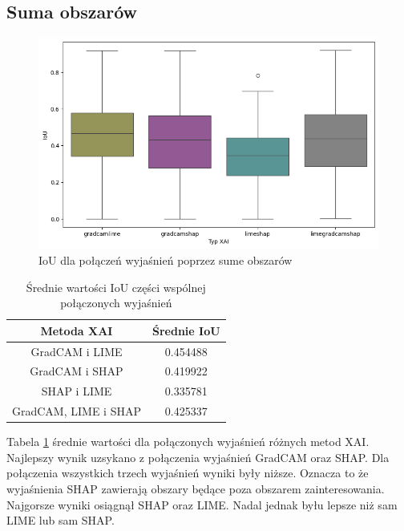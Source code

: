 \subsection*{Suma obszarów}
\begin{figure}
	\centering\includegraphics[width=.6\textwidth]{img/combine_iou_or}
	\caption{IoU dla połączeń wyjaśnień poprzez sume obszarów}  \label{rys:combine_iou_or}
\end{figure}
\begin{table}
	\centering
	\begin{tabular}{|c|c|}
		\hline
		\textbf{Metoda XAI}  & Średnie IoU \\
		\hline
		GradCAM i LIME       & 0.454488    \\
		\hline
		GradCAM i SHAP       & 0.419922    \\
		\hline
		SHAP i LIME          & 0.335781    \\
		\hline
		GradCAM, LIME i SHAP & 0.425337    \\
		\hline
	\end{tabular}
	\caption{Średnie wartości IoU części wspólnej połączonych wyjaśnień}
	\label{tab:combineandiou}
\end{table}
Tabela \ref{tab:combineandiou} średnie wartości dla połączonych wyjaśnień różnych metod XAI.
Najlepszy wynik uzsykano z połączenia wyjaśnień GradCAM oraz SHAP.
Dla połączenia wszystkich trzech wyjaśnień wyniki były niższe.
Oznacza to że wyjaśnienia SHAP zawierają obszary będące poza obszarem zainteresowania.
Najgorsze wyniki osiągnął SHAP oraz LIME.
Nadal jednak byłu lepsze niż sam LIME lub sam SHAP.

